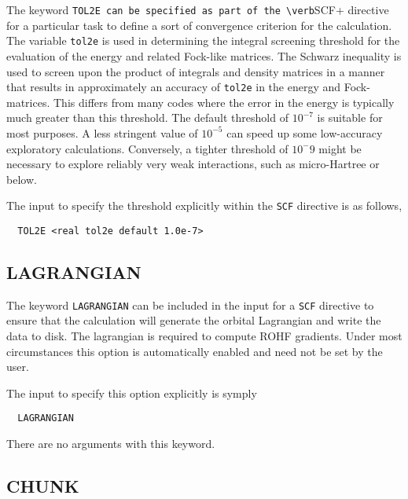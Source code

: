 The keyword \verb+TOL2E can be specified as part of the \verb+SCF+ 
directive for a particular task to define a sort of convergence
criterion for the calculation.  
The variable \verb+tol2e+ is used in determining the integral screening 
threshold for the
evaluation of the energy and related Fock-like matrices.  The Schwarz
inequality is used to screen upon the product of integrals and density
matrices in a manner that results in approximately an accuracy of
\verb+tol2e+ in the energy and Fock-matrices.  This differs from many
codes where the error in the energy is typically much greater than
this threshold.  The default threshold of $10^{-7}$ is suitable for most 
purposes.
A less stringent value of $10^{-5}$ can speed up some low-accuracy 
exploratory calculations.  Conversely, a tighter threshold of $10^-9$ might be
necessary to explore reliably very weak
interactions, such as micro-Hartree or below.

The input to specify the threshold explicitly within the
\verb+SCF+ directive is as follows,

\begin{verbatim}
  TOL2E <real tol2e default 1.0e-7>
\end{verbatim}


\subsection{LAGRANGIAN}



The keyword \verb+LAGRANGIAN+ can be included in the input for a
\verb+SCF+ directive to ensure that the calculation will generate
the orbital Lagrangian and write the data to disk. The
lagrangian is required to compute ROHF gradients.  Under most
circumstances this option is automatically enabled and need not be set
by the user.

The input to specify this option explicitly is symply
\begin{verbatim}
  LAGRANGIAN
\end{verbatim}

There are no arguments with this keyword.

\subsection{CHUNK}

